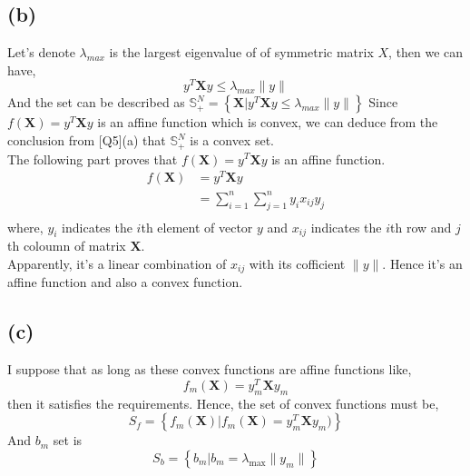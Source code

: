 \documentclass[12pt, a4 paper]{article}
\begin{document}
\begin{framed}
        \subsection{(b)}
        Let's denote $\lambda_{max}$ is the largest eigenvalue of of symmetric matrix $X$, then
        we can have,
        $$
        y^{T} \boldsymbol{X} y \leq \lambda_{max} \lVert y \rVert
        $$
        \indent And the set can be described as $\mathbb{S}_{+}^{N} = \left\{ \boldsymbol{X} \lvert
         y^{T} \boldsymbol{X} y \leq \lambda_{max} \lVert y \rVert \right\}$
        Since $f(\boldsymbol{X}) = y^{T} \boldsymbol{X} y$ is an affine function which is convex,
        we can deduce from the conclusion from [Q5](a) that $\mathbb{S}_{+}^{N}$ is a convex set.\\
        \indent The following part proves that $f(\boldsymbol{X}) = y^{T} \boldsymbol{X} y$ is an
        affine function.
        \begin{align*}
        f(\boldsymbol{X}) &= y^{T} \boldsymbol{X} y \\
        &= \sum\limits_{i=1}^{n} \sum\limits_{j=1}^{n} y_{i} x_{ij} y_{j} \\
        \end{align*}
        \indent where, $y_{i}$ indicates the $i$th element of vector $y$ and $x_{ij}$ indicates the $i$th row
        and $j$th coloumn of matrix $\boldsymbol{X}$. \\
        \indent Apparently, it's a linear combination of $x_{ij}$ with its cofficient $\lVert y \rVert$. Hence
        it's an affine function and also a convex function.

        \subsection{(c)}
        I suppose that as long as these convex functions are affine functions like,
        $$
        f_{m}(\boldsymbol{X}) = y_{m}^{T} \boldsymbol{X} y_{m}
        $$
        \indent then it satisfies the requirements. Hence, the set of convex functions must be,
        $$
        S_{f} = \left\{ f_{m}(\boldsymbol{X}) \lvert f_{m}(\boldsymbol{X}) =  y_{m}^{T} 
        \boldsymbol{X} y_{m}) \right\}
        $$
        \indent And $b_{m}$ set is
        $$
        S_{b} = \left\{ 
            b_{m} \lvert b_{m} = \lambda_{\max} \lVert y_{m} \rVert
        \right\}
        $$

    \end{framed}
\end{document}
